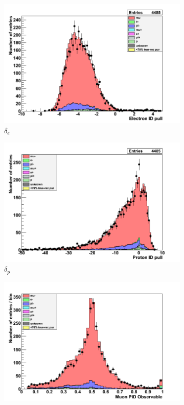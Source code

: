 \begin{figure}[h]
	\begin{subfigure}[t]{0.32\textwidth}
		\includegraphics[width=\textwidth]{figures/numu/Cuts/numu/Elepull_run12}
		\caption{$\delta_e$}
	\end{subfigure}
	\begin{subfigure}[t]{0.32\textwidth}	
		\includegraphics[width=\textwidth]{figures/numu/Cuts/numu/Protpull_run12}
		\caption{$\delta_p$}
	\end{subfigure}
	\begin{subfigure}[t]{0.32\textwidth}
		\includegraphics[width=\textwidth]{figures/numu/Cuts/numu/Mulikelihood_run2}

\end{subfigure}
\end{figure}
